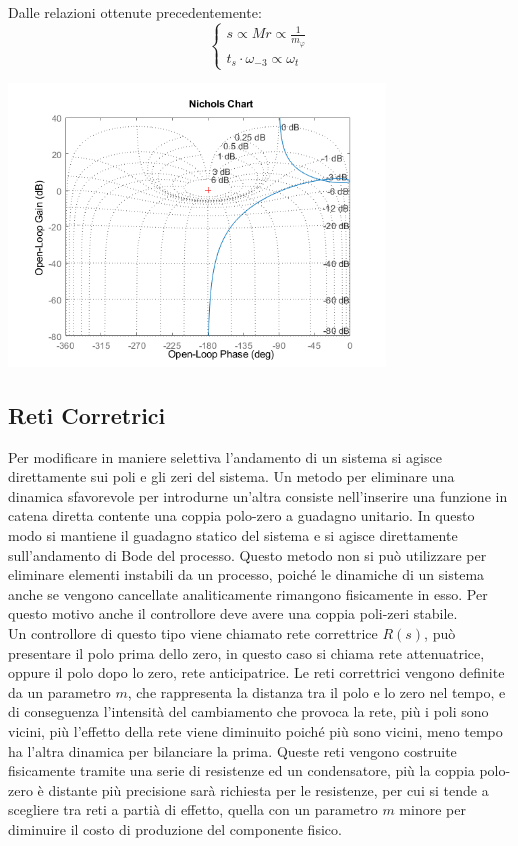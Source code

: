 \documentclass{article}
\numberwithin{equation}{subsection}
\begin{document}
Dalle relazioni ottenute precedentemente: 
\begin{equation}
    \begin{cases}
        s\propto Mr\propto\displaystyle\frac{1}{m_{\varphi}}\\
        t_s\cdot\omega_{-3}\propto\omega_t
    \end{cases}
\end{equation}

\begin{center}
    \includegraphics[width=10cm]{Nichols1.png}
\end{center}

\subsection{Reti Corretrici}

Per modificare in maniere selettiva l'andamento di un sistema si agisce direttamente sui poli e gli zeri del sistema. Un metodo per eliminare una dinamica sfavorevole per 
introdurne un'altra consiste nell'inserire una funzione in catena diretta contente una coppia polo-zero a guadagno unitario. In questo modo si mantiene il guadagno statico 
del sistema e si agisce direttamente sull'andamento di Bode del processo. Questo metodo non si può utilizzare per eliminare elementi instabili da un processo, poiché le 
dinamiche di un sistema anche se vengono cancellate analiticamente rimangono fisicamente in esso. Per questo motivo anche il controllore deve avere una coppia poli-zeri 
stabile. \\

Un controllore di questo tipo viene chiamato rete correttrice $R(s)$, può presentare il polo prima dello zero, in questo caso si chiama rete attenuatrice, oppure il polo 
dopo lo zero, rete anticipatrice. Le reti correttrici vengono definite da un parametro $m$, che rappresenta la distanza tra il polo e lo zero nel tempo, e di conseguenza 
l'intensità del cambiamento che provoca la rete, più i poli sono vicini, più l'effetto della rete viene diminuito poiché più sono vicini, meno tempo ha l'altra dinamica 
per bilanciare la prima. Queste reti vengono costruite fisicamente tramite una serie di resistenze ed un condensatore, più la coppia polo-zero è distante più precisione sarà richiesta per le 
resistenze, per cui si tende a scegliere tra reti a partià di effetto, quella con un parametro $m$ minore per diminuire il costo di produzione del componente fisico. \\
\end{document}
